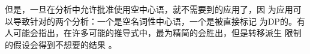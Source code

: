 但是，一旦在分析中允许批准使用空中心语，就不需要到的应用了，因
为应用可以导致针对的两个分析：一个是空名词性中心语，一个是被直接标记
为DP的。有人可能会指出，在许多可能的推导式中，最为精简的会胜出，但是转移派生
限制的假设会得到不想要的结果
\citep[第5节]{Pullum2013a}。

